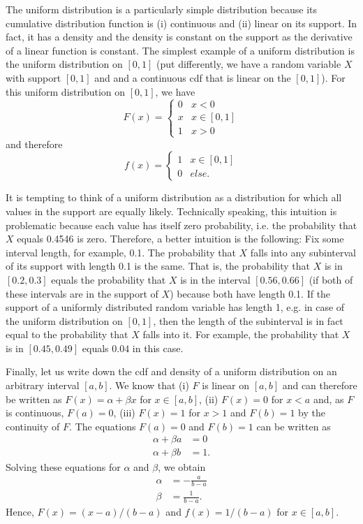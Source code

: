 \documentclass[a4paper,12pt]{article}
\begin{document}
The uniform distribution is a particularly simple distribution because its cumulative distribution function is (i) continuous and (ii) linear on its support. In fact, it has a density and the density is constant on the support as the derivative of a linear function is constant. The simplest example of a uniform distribution is the uniform distribution on $[0,1]$ (put differently, we have a random variable $X$ with support $[0,1]$ and and a continuous cdf that is linear on the $[0,1]$). For this uniform distribution on $[0,1]$, we have
$$F(x)=
\begin{cases}
  0 & x<0\\
  x & x\in[0,1]\\
  1 &x>0
\end{cases}$$
and therefore
$$f(x)=
\begin{cases}
  1 & x\in[0,1]\\
  0 & else.
\end{cases}$$

It is tempting to think of a uniform distribution as a distribution for which all values in the support are equally likely. Technically speaking, this intuition is problematic because each value has itself zero probability, i.e. the probability that $X$ equals 0.4546 is zero. Therefore, a better intuition is the following: Fix some interval length, for example, 0.1. The probability that $X$ falls into any subinterval of its support with length 0.1 is the same. That is, the probability that $X$ is in $[0.2,0.3]$ equals the probability that $X$ is in the interval $[0.56,0.66]$ (if both of these intervals are in the support of $X$) because both have length 0.1. If the support of a uniformly distributed random variable has length 1, e.g. in case of the uniform distribution on $[0,1]$, then the length of the subinterval is in fact equal to the probability that $X$ falls into it. For example, the probability that $X$ is in $[0.45,0.49]$ equals $0.04$ in this case.

Finally, let us write down the cdf and density of a uniform distribution on an arbitrary interval $[a,b]$. We know that (i) $F$ is linear on $[a,b]$ and can therefore be written as $F(x)=\alpha+\beta x$ for $x\in[a,b]$, (ii) $F(x)=0$ for $x<a$ and, as $F$ is continuous, $F(a)=0$, (iii) $F(x)=1$ for $x>1$ and $F(b)=1$ by the continuity of $F$. The equations $F(a)=0$ and $F(b)=1$ can be written as
\begin{align*}
  \alpha+\beta a&=0\\
  \alpha+\beta b&=1.
\end{align*}
Solving these equations for $\alpha$ and $\beta$, we obtain
\begin{align*}
  \alpha&=-\frac{a}{b-a}\\
  \beta&=\frac{1}{b-a}.        
\end{align*}
Hence, $F(x)=(x-a)/(b-a)$ and $f(x)=1/(b-a)$ for $x\in[a,b]$.
\end{document}
